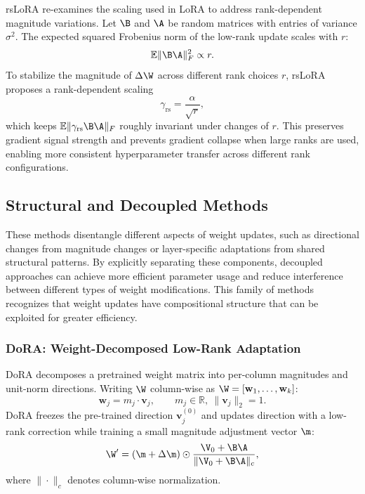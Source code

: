 rsLoRA re-examines the scaling used in LoRA to address rank-dependent magnitude variations. Let $\B$ and $\A$ be random matrices with entries of variance $\sigma^2$. The expected squared Frobenius norm of the low-rank update scales with $r$:
\begin{equation}
  \mathbb{E}\|\B\A\|_F^2 \propto r.
\end{equation}
To stabilize the magnitude of $\Delta\W$ across different rank choices $r$, rsLoRA proposes a rank-dependent scaling
\begin{equation}
  \gamma_{\text{rs}} = \frac{\alpha}{\sqrt{r}},
\end{equation}
which keeps $\mathbb{E}\|\gamma_{\text{rs}}\B\A\|_F$ roughly invariant under changes of $r$. This preserves gradient signal strength and prevents gradient collapse when large ranks are used, enabling more consistent hyperparameter transfer across different rank configurations.

\subsection{Structural and Decoupled Methods}
\label{subsec:decoupled}

These methods disentangle different aspects of weight updates, such as directional changes from magnitude changes or layer-specific adaptations from shared structural patterns. By explicitly separating these components, decoupled approaches can achieve more efficient parameter usage and reduce interference between different types of weight modifications. This family of methods recognizes that weight updates have compositional structure that can be exploited for greater efficiency.

\subsubsection{DoRA: Weight-Decomposed Low-Rank Adaptation \cite{liu2024dora}}
\label{subsubsec:dora}

DoRA decomposes a pretrained weight matrix into per-column magnitudes and unit-norm directions. Writing $\W$ column-wise as $\W=[\mathbf{w}_1,\dots,\mathbf{w}_k]$:
\begin{equation}
  \mathbf{w}_j = m_j \cdot \mathbf{v}_j,\qquad m_j\in\mathbb{R},\ \|\mathbf{v}_j\|_2=1.
\end{equation}
DoRA freezes the pre-trained direction $\mathbf{v}_{j}^{(0)}$ and updates direction with a low-rank correction while training a small magnitude adjustment vector $\m$:
\begin{equation}
  \W' = (\m + \Delta\m) \odot \frac{\V_0 + \B\A}{\|\V_0 + \B\A\|_c},
\end{equation}
where $\|\cdot\|_c$ denotes column-wise normalization.

